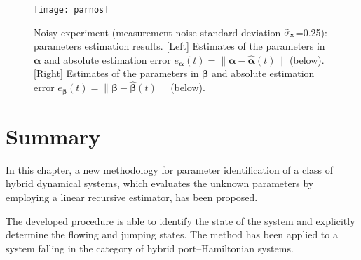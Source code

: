%
%
\begin{figure}[!ht]
	\centering
	\texttt{[image: parnos]}
	\caption[Noisy experiment: parameters estimation results.]{Noisy experiment (measurement noise standard deviation $\tilde{\sigma}_{\mathbf{x}}$=0.25): parameters estimation results. [Left] Estimates of the parameters in $\bm{\alpha}$ and absolute estimation error $e_{\bm{\alpha}}(t)=\|\bm{\alpha}-\hat{\bm{\alpha}}(t)\|$ (below). [Right] Estimates of the parameters in $\bm{\beta}$ and absolute estimation error $e_{\bm{\beta}}(t)=\|\bm{\beta}-\hat{\bm{\beta}}(t)\|$ (below).}
	\label{fig:parnos}
\end{figure}

\clearpage
\section{Summary}\label{conc}
In this chapter, a new methodology for parameter identification of a class of hybrid dynamical systems, which evaluates the unknown parameters by employing a linear recursive estimator, has been proposed. 
%
\newline

%
The developed procedure is able to identify the state of the system and explicitly determine the flowing and jumping states. The method has been applied to a system falling in the category of hybrid port--Hamiltonian systems.
%